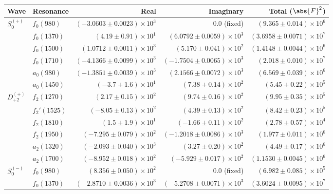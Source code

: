 \begin{table}[ht]
    \begin{center}
        \begin{tabular}{llrrr}\toprule
        Wave & Resonance & Real & Imaginary & Total ($\abs{F}^2$) \\\midrule
$S_{0}^{(+)}$ & $f_{0}(980)$ & $(-3.0603 \pm 0.0023) \times 10^{3}$ & $0.0$ (fixed) & $(9.365 \pm 0.014) \times 10^{6}$ \\
 & $f_{0}(1370)$ & $(4.19 \pm 0.91) \times 10^{1}$ & $(6.0792 \pm 0.0059) \times 10^{3}$ & $(3.6958 \pm 0.0071) \times 10^{7}$ \\
 & $f_{0}(1500)$ & $(1.0712 \pm 0.0011) \times 10^{3}$ & $(5.170 \pm 0.041) \times 10^{2}$ & $(1.4148 \pm 0.0044) \times 10^{6}$ \\
 & $f_{0}(1710)$ & $(-4.1366 \pm 0.0099) \times 10^{3}$ & $(-1.7504 \pm 0.0065) \times 10^{3}$ & $(2.018 \pm 0.010) \times 10^{7}$ \\
 & $a_{0}(980)$ & $(-1.3851 \pm 0.0039) \times 10^{3}$ & $(2.1566 \pm 0.0072) \times 10^{3}$ & $(6.569 \pm 0.039) \times 10^{6}$ \\
 & $a_{0}(1450)$ & $(-3.7 \pm 1.6) \times 10^{1}$ & $(7.38 \pm 0.14) \times 10^{2}$ & $(5.45 \pm 0.22) \times 10^{5}$ \\
$D_{+2}^{(+)}$ & $f_{2}(1270)$ & $(2.17 \pm 0.15) \times 10^{2}$ & $(9.74 \pm 0.16) \times 10^{2}$ & $(9.95 \pm 0.35) \times 10^{5}$ \\
 & $f_{2}'(1525)$ & $(-8.05 \pm 0.13) \times 10^{2}$ & $(4.39 \pm 0.13) \times 10^{2}$ & $(8.42 \pm 0.23) \times 10^{5}$ \\
 & $f_{2}(1810)$ & $(1.5 \pm 1.9) \times 10^{1}$ & $(-1.66 \pm 0.11) \times 10^{2}$ & $(2.78 \pm 0.57) \times 10^{4}$ \\
 & $f_{2}(1950)$ & $(-7.295 \pm 0.079) \times 10^{2}$ & $(-1.2018 \pm 0.0086) \times 10^{3}$ & $(1.977 \pm 0.011) \times 10^{6}$ \\
 & $a_{2}(1320)$ & $(-2.093 \pm 0.040) \times 10^{3}$ & $(3.27 \pm 0.20) \times 10^{2}$ & $(4.49 \pm 0.17) \times 10^{6}$ \\
 & $a_{2}(1700)$ & $(-8.952 \pm 0.018) \times 10^{2}$ & $(-5.929 \pm 0.017) \times 10^{2}$ & $(1.1530 \pm 0.0045) \times 10^{6}$ \\
$S_{0}^{(-)}$ & $f_{0}(980)$ & $(8.356 \pm 0.050) \times 10^{2}$ & $0.0$ (fixed) & $(6.982 \pm 0.085) \times 10^{5}$ \\
 & $f_{0}(1370)$ & $(-2.8710 \pm 0.0036) \times 10^{3}$ & $(-5.2708 \pm 0.0071) \times 10^{3}$ & $(3.6024 \pm 0.0095) \times 10^{7}$ \\

\end{tabular}
\end{center}
\end{table}
